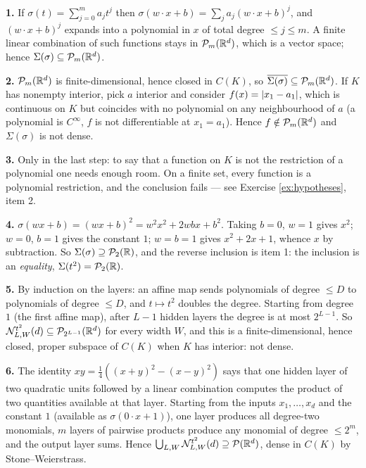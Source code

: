 \documentclass[11pt,a4paper]{article}
\begin{document}
\textbf{1.} If $\sigma(t) = \sum_{j=0}^m a_jt^j$ then
$\sigma(w\cdot x+b) = \sum_j a_j (w\cdot x + b)^j$, and $(w\cdot x+b)^j$ expands into a polynomial
in $x$ of total degree $\le j \le m$. A finite linear combination of such functions stays in
$\mathcal{P}_m(\mathbb{R}^d)$, which is a vector space; hence $\Sigma(\sigma)\subseteq\mathcal{P}_m(\mathbb{R}^d)$.

\textbf{2.} $\mathcal{P}_m(\mathbb{R}^d)$ is finite-dimensional, hence closed in $C(K)$, so
$\overline{\Sigma(\sigma)}\subseteq\mathcal{P}_m(\mathbb{R}^d)$. If $K$ has nonempty interior, pick $a$ interior and
consider $f(x) = \left\lvert x_1 - a_1 \right\rvert$, which is continuous on $K$ but coincides with no polynomial on
any neighbourhood of $a$ (a polynomial is $C^\infty$, $f$ is not differentiable at $x_1 = a_1$).
Hence $f \notin \mathcal{P}_m(\mathbb{R}^d)$ and $\Sigma(\sigma)$ is not dense.

\textbf{3.} Only in the last step: to say that a function on $K$ is not the restriction of a
polynomial one needs enough room. On a finite set, every function is a polynomial restriction, and
the conclusion fails --- see Exercise \ref{ex:hypotheses}, item 2.

\textbf{4.} $\sigma(wx+b) = (wx+b)^2 = w^2x^2 + 2wbx + b^2$. Taking $b = 0$, $w=1$ gives $x^2$;
$w = 0$, $b = 1$ gives the constant $1$; $w = b = 1$ gives $x^2+2x+1$, whence $x$ by subtraction.
So $\Sigma(\sigma) \supseteq \mathcal{P}_2(\mathbb{R})$, and the reverse inclusion is item 1: the inclusion is an
\emph{equality}, $\Sigma(t^2) = \mathcal{P}_2(\mathbb{R})$.

\textbf{5.} By induction on the layers: an affine map sends polynomials of degree $\le D$ to
polynomials of degree $\le D$, and $t \mapsto t^2$ doubles the degree. Starting from degree $1$
(the first affine map), after $L-1$ hidden layers the degree is at most $2^{L-1}$. So
$\mathcal{N}^{t^2}_{L,W}(d)\subseteq \mathcal{P}_{2^{L-1}}(\mathbb{R}^d)$ for every width $W$, and this is a
finite-dimensional, hence closed, proper subspace of $C(K)$ when $K$ has interior: not dense.

\textbf{6.} The identity $xy = \tfrac14((x+y)^2 - (x-y)^2)$ says that one hidden layer of two
quadratic units followed by a linear combination computes the product of two quantities available at
that layer. Starting from the inputs $x_1,\dots,x_d$ and the constant $1$ (available as
$\sigma(0\cdot x + 1)$), one layer produces all degree-two monomials, $m$ layers of pairwise
products produce any monomial of degree $\le 2^m$, and the output layer sums. Hence
$\bigcup_{L,W}\mathcal{N}^{t^2}_{L,W}(d)\supseteq \mathcal{P}(\mathbb{R}^d)$, dense in $C(K)$ by Stone--Weierstrass.
\end{document}
